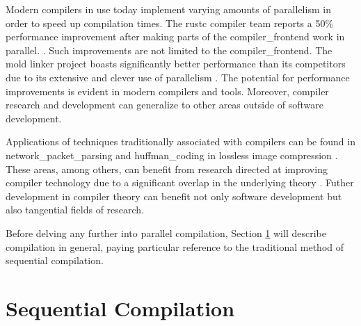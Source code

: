 Modern compilers in use today implement varying amounts of parallelism in order
to speed up compilation times. The \gls{rustc} compiler team reports a 50\%
performance improvement after making parts of the \gls{compiler_frontend} work
in parallel. \citep{nicholas_nethercote_faster_2023}. Such improvements are not
limited to the \gls{compiler_frontend}. The mold \gls{linker} project boasts
significantly better performance than its competitors due to its extensive and
clever use of parallelism \citep{rui_ueyama_design_nodate}. The potential for
performance improvements is evident in modern compilers and tools. Moreover,
compiler research and development can generalize to other areas outside of
software development.

Applications of techniques traditionally associated with compilers can
be found in \gls{network_packet_parsing} \citep{wang_hyperscan_2019,
roesch_snort_1999} and \Gls{huffman_coding} in lossless image compression
\citep{howard_parallel_1996}. These areas, among others, can benefit from
research directed at improving compiler technology due to a significant
overlap in the underlying theory \citep{mytkowicz_data-parallel_2014}. Futher
development in compiler theory can benefit not only software development but
also tangential fields of research.

Before delving any further into parallel compilation, Section \ref{seq_comp}
will describe compilation in general, paying particular reference to the
traditional method of sequential compilation.

\section{Sequential Compilation} \label{seq_comp}

